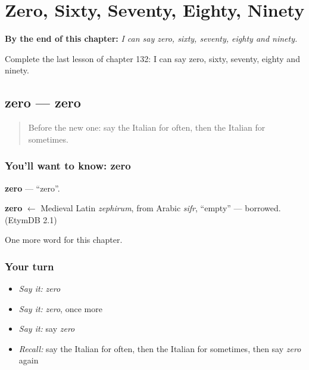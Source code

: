 
\chapter{Zero, Sixty, Seventy, Eighty, Ninety}
\label{ch:it-zero-sixty-seventy-eighty-ninety}

\begin{chapteropening}
\textbf{By the end of this chapter:} \emph{I can say zero, sixty, seventy, eighty and ninety.}

Complete the last lesson of chapter 132: I can say zero, sixty, seventy, eighty and ninety.
\end{chapteropening}

\section[zero]{zero — zero}

\label{lesson:IT-C132-zero}



\begin{quote}
Before the new one: say the Italian for often, then the Italian for sometimes.
\end{quote}

\subsection*{You'll want to know: zero}
\textbf{zero} — \textquotedblleft{}zero\textquotedblright{}.

\begin{cousinweb}
\textbf{zero} $\leftarrow$ Medieval Latin \emph{zephirum}, from Arabic \emph{sifr}, \textquotedblleft{}empty\textquotedblright{} — borrowed. (EtymDB 2.1)
\end{cousinweb}

\begin{grammarlens}[title={What you've built}]
One more word for this chapter.
\end{grammarlens}

\subsection*{Your turn}
\begin{itemize}
\raggedright
  \item \emph{Say it:} \emph{zero}
  \item \emph{Say it:} \emph{zero}, once more
  \item \emph{Say it:} say \emph{zero}
  \item \emph{Recall:} say the Italian for often, then the Italian for sometimes, then say \emph{zero} again
\end{itemize}

